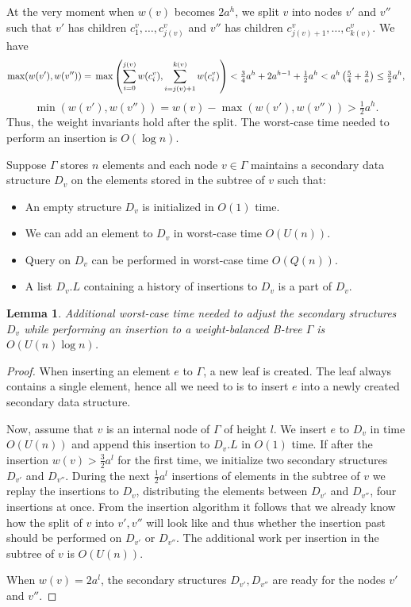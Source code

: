 \documentclass[a4paper]{article}
\newtheorem{lemma}[theorem]{Lemma}
\theoremstyle{remark}
\begin{document}
At the very moment when $w(v)$ becomes $2a^h$, we split $v$ into nodes $v'$ and $v''$ such that
$v'$ has children $c^v_1,\ldots,c^v_{j(v)}$ and $v''$ has
children $c^v_{j(v)+1},\ldots,c^v_{k(v)}$.
We have $$\max(w(v'),w(v''))=\\
\max\left(\sum_{i=0}^{j(v)}w(c^v_i),\sum_{i=j(v)+1}^{k(v)} w(c^v_i)\right)<\\
\tfrac{3}{4}a^h+2a^{h-1}+\tfrac{1}{2}a^h<a^h\left(\tfrac{5}{4}+\tfrac{2}{a}\right)\leq \tfrac{3}{2}a^h,$$
$$\min(w(v'),w(v''))=w(v)-\max(w(v'),w(v''))>\tfrac{1}{2} a^h.$$
Thus, the weight invariants hold after the split.
The worst-case time needed to perform an insertion is $O(\log{n})$.

Suppose $\Gamma$ stores $n$ elements and each node $v\in \Gamma$ maintains a secondary
data structure $D_v$ on the elements stored in the subtree of $v$
such that:
\begin{itemize}
  \item An empty structure $D_v$ is initialized in $O(1)$ time.
  \item We can add an element to $D_v$ in worst-case time $O(U(n))$.
  \item Query on $D_v$ can be performed in worst-case time $O(Q(n))$.
  \item A list $D_v.L$ containing a history of insertions to $D_v$
    is a part of $D_v$.
\end{itemize}
\begin{lemma}
Additional worst-case time needed to adjust the secondary structures
$D_v$ while performing an insertion to a weight-balanced B-tree $\Gamma$
is $O(U(n)\log n)$.
\end{lemma}
\begin{proof}
When inserting an element $e$ to $\Gamma$, a new leaf is created.
The leaf always contains a single element, hence all we need to
is to insert $e$ into a newly created secondary data structure.

Now, assume that $v$ is an internal node of $\Gamma$ of height $l$.
We insert $e$ to $D_v$ in time $O(U(n))$ and append this insertion
to $D_v.L$ in $O(1)$ time.
If after the insertion $w(v)>\frac{3}{2}a^l$ for the first time,
we initialize two secondary structures $D_{v'}$ and $D_{v''}$.
During the next $\frac{1}{2}a^l$ insertions of elements
in the subtree of $v$ we replay the insertions to $D_v$,
distributing the elements between $D_{v'}$ and $D_{v''}$,
four insertions at once.
From the insertion algorithm it follows that we already
know how the split of $v$ into $v',v''$ will look like
and thus whether the insertion past should be
performed on $D_{v'}$ or $D_{v''}$.
The additional work per insertion in the subtree of $v$
is $O(U(n))$.

When $w(v)=2a^l$, the secondary structures $D_{v'},D_{v''}$
are ready for the nodes $v'$ and $v''$.
\end{proof}
\end{document}

